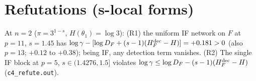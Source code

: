 \documentclass[11pt]{article}
\theoremstyle{remark}\newtheorem{remark}[theorem]{Remark}
\begin{document}
\section{Refutations (s-local forms)}
At $n=2$ ($\pi=3^{1-s}$, $H(\theta_1)=\log3$): (R1) the uniform IF network on $F$ at $p=11$, $s=1.45$ has
$\log\gamma-[\log D_F+(s-1)(H^{\rm dec}_F-H)]=+0.181>0$ (also $p=13$; $+0.12$ to $+0.38$); being IF, any detection term vanishes.
(R2) The single IF block at $p=5$, $s\in(1.4276,1.5]$ violates $\log\gamma\le\log D_F-(s-1)(H^{\rm dec}_F-H)$ (\texttt{c4\_refute.out}).
\end{document}
